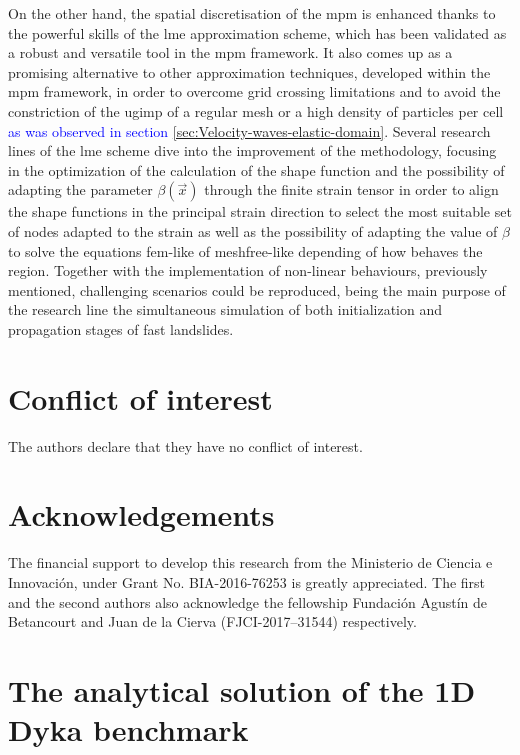 \documentclass[preprint,12pt,a4paper]{elsarticle}
\begin{document}
On the other hand, the spatial discretisation of the \acrshort{mpm} is enhanced thanks to the powerful skills of the \acrfull{lme} approximation scheme, which has been validated as a robust and versatile tool in the \acrshort{mpm} framework. It also comes up as a promising alternative to other approximation techniques, developed within the \acrshort{mpm} framework, in order to overcome grid crossing limitations and to avoid the constriction of the \acrshort{ugimp} of a regular mesh or a high density of particles per cell \textcolor{blue}{as was observed in section \ref{sec:Velocity-waves-elastic-domain}}. Several research lines of the \acrshort{lme} scheme dive into the improvement of the methodology, focusing in the optimization of the calculation of the shape function and the possibility of adapting the parameter $\beta(\vec{x})$ through the finite strain
tensor in order to align the shape functions in the principal strain
direction to select the most suitable set of nodes adapted to the strain as well as the possibility of adapting the value of $\beta$ to solve the equations
\acrshort{fem}-like of meshfree-like depending of how behaves the
region. Together with the implementation of non-linear behaviours, previously mentioned, challenging scenarios could be reproduced, being the main purpose of the research line the simultaneous simulation of both initialization and
propagation stages of fast landslides.

% 
\section*{Conflict of interest}
%
The authors declare that they have no conflict of interest.

% 
\section*{Acknowledgements}
%
The financial support to develop this research from the Ministerio de Ciencia e Innovaci\'on, under Grant No. BIA-2016-76253 is greatly appreciated. The first and the second authors also acknowledge the fellowship Fundaci\'on Agust\'in de Betancourt and Juan de la Cierva (FJCI-2017–31544) respectively.


\printglossaries

\appendix

\section{The analytical solution of the 1D Dyka benchmark}
\label{app:analytical_sol}
\end{document}
